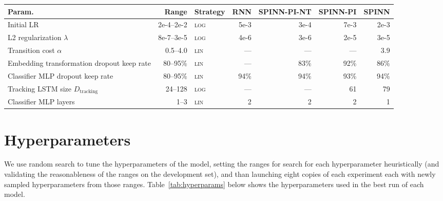 \documentclass[11pt]{article}
\newcommand\todo[1]{\textcolor{blue}{\textbf{TODO:} #1}}
\def\ii#1{\textit{#1}}
\begin{document}
%    
 
 

 
\begin{table*}[t]\small
\begin{center}
\begin{tabular}{lrlrrrr}
\toprule
Param.     & Range & Strategy        & RNN       & SPINN-PI-NT   & SPINN-PI  & SPINN \\
\midrule 
Initial LR & 2e-4--2e-2 & \textsc{log} & 5e-3  & 3e-4 & 7e-3  & 2e-3\\
L2 regularization $\lambda$ & 8e-7--3e-5   & \textsc{log} & 4e-6  & 3e-6   & 2e-5  & 3e-5\\
Transition cost $\alpha$  & 0.5--4.0 & \textsc{lin} & --- & --- & ---  & 3.9    \\
Embedding transformation dropout keep rate & 80--95\% & \textsc{lin} & --- & 83\% & 92\%  & 86\%\\
Classifier MLP dropout keep rate & 80--95\% & \textsc{lin} & 94\%  & 94\%   & 93\%  & 94\%\\
Tracking LSTM size $D_\text{tracking}$ & 24--128 & \textsc{log} & --- & --- & 61  & 79\\
Classifier MLP layers & 1--3 & \textsc{lin} & 2 & 2 & 2 & 1\\
\bottomrule
\end{tabular}
\end{center}
 
\caption{
\label{tab:hyperparams}
Hyperparameter ranges and values. \ii{Range} shows the hyperparameter ranges explored during random search. \ii{Strategy} indicates whether sampling from the range was uniform, or log--uniform.
}
\end{table*}

\appendix
\section{Hyperparameters}\label{sec:hyperparams}


We use random search to tune the hyperparameters of the model, setting the ranges for search for each hyperparameter heuristically (and validating the reasonableness of the ranges on the development set), and than launching eight copies of each experiment each with newly sampled hyperparameters from those ranges. Table~\ref{tab:hyperparams} below shows the hyperparameters used in the best run of each model.
\end{document}
